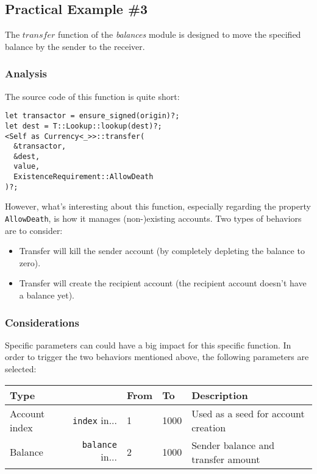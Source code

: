 \documentclass[11pt,a4paper]{article}
\begin{document}
\subsection{Practical Example \#3}

The $transfer$ function of the \textit{balances} module is designed to move the
specified balance by the sender to the receiver.
\newline

\subsubsection{Analysis}

The source code of this function is quite short:

\begin{verbatim}
let transactor = ensure_signed(origin)?;
let dest = T::Lookup::lookup(dest)?;
<Self as Currency<_>>::transfer(
  &transactor,
  &dest,
  value,
  ExistenceRequirement::AllowDeath
)?;
\end{verbatim}

However, what's interesting about this function, especially regarding the
property \verb|AllowDeath|, is how it manages (non-)existing accounts. Two types
of behaviors are to consider:

\begin{itemize}
  \item Transfer will kill the sender account (by completely depleting the
  balance to zero).
  \item Transfer will create the recipient account (the recipient account
  doesn't have a balance yet).
\end{itemize}

\subsubsection{Considerations}

Specific parameters can could have a big impact for this specific function. In
order to trigger the two behaviors mentioned above, the following parameters are
selected:

\begin{center}
  \begin{tabular}{ l|r l l l }
    \textbf{Type} && \textbf{From} & \textbf{To} & \textbf{Description}\\
    \hline
    Account index & \verb|index| in... & 1 & 1000 & Used as a seed for account
    creation \\
    Balance & \verb|balance| in... & 2 & 1000 & Sender balance and transfer
    amount \\
  \end{tabular}
\end{center}
\end{document}
